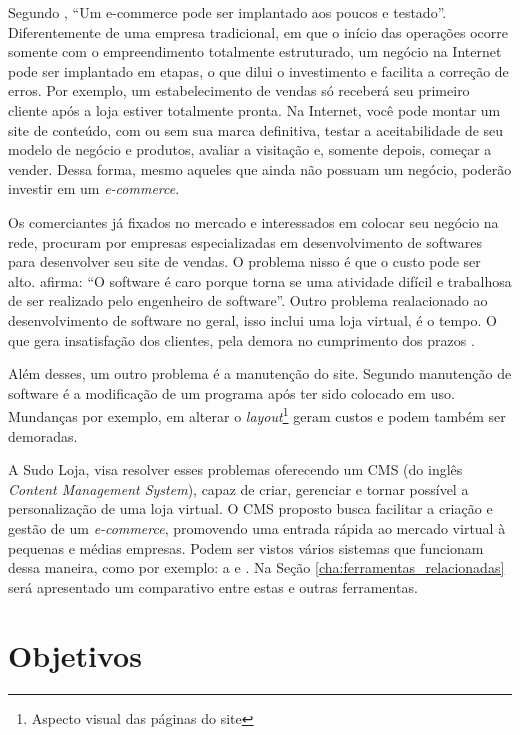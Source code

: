 \documentclass[a4paper,12pt]{monografia}
\begin{document}
Segundo , ``Um e-commerce pode ser implantado aos poucos e testado''. Diferentemente de uma empresa tradicional, em que o início das operações ocorre somente com o empreendimento totalmente estruturado, um negócio na Internet pode ser implantado em etapas, o que dilui o investimento e facilita a correção de erros. Por exemplo, um estabelecimento de vendas só receberá seu primeiro cliente após a loja estiver totalmente pronta. Na Internet, você pode montar um site de conteúdo, com ou sem sua marca definitiva, testar a aceitabilidade de seu modelo de negócio e produtos, avaliar a visitação e, somente depois, começar a vender. Dessa forma, mesmo aqueles que ainda não possuam um negócio, poderão investir em um \textit{e-commerce}.

Os comerciantes já fixados no mercado e interessados em colocar seu negócio na rede, procuram por empresas especializadas em desenvolvimento de softwares para desenvolver seu site de vendas. O problema nisso é que o custo pode ser alto.  afirma: ``O software é caro porque torna se uma atividade difícil e trabalhosa de ser realizado pelo engenheiro de software''.  Outro problema realacionado ao desenvolvimento de software no geral, isso inclui uma loja virtual, é o tempo. O que gera insatisfação dos clientes, pela demora no cumprimento dos prazos \cite{pressman}.

Além desses, um outro problema é a manutenção do site. Segundo  manutenção de software é a modificação de um programa após ter sido colocado em uso. Mundanças por exemplo, em alterar o \textit{layout}\footnote{Aspecto visual das páginas do site} geram custos e podem também ser demoradas.

A Sudo Loja, visa resolver esses problemas oferecendo um CMS (do inglês \textit{Content Management System}), capaz de criar, gerenciar e tornar possível a personalização de uma loja virtual. O CMS proposto busca facilitar a criação e gestão de um \textit{e-commerce}, promovendo uma entrada rápida ao mercado virtual à pequenas e médias empresas. Podem ser vistos vários sistemas que funcionam dessa maneira, como por exemplo: a  e . Na Seção \ref{cha:ferramentas_relacionadas} será apresentado um comparativo entre estas e outras ferramentas.



\section{Objetivos} %
\label{sec:objetivos}
\end{document}

